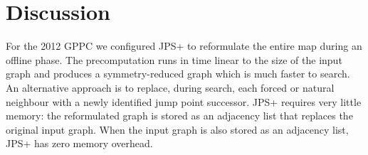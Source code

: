 \section{Discussion}
For the 2012 GPPC we configured 
JPS+ to reformulate the entire map during an offline phase.
The precomputation runs in time linear to the size of the input graph
and produces a symmetry-reduced graph which is much faster
to search. 
An alternative approach is to replace, during search, each forced or 
natural neighbour with a newly identified jump point successor.
JPS+ requires very little memory: the reformulated graph
is stored as an adjacency list that replaces the original input graph.
When the input graph is also stored as an adjacency list, JPS+
has zero memory overhead.
